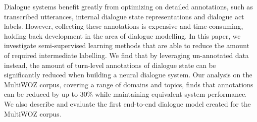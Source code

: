 Dialogue systems benefit greatly from optimizing on detailed annotations, such as transcribed utterances, internal dialogue state representations and dialogue act labels. However, collecting these annotations is expensive and time-consuming, holding back development in the area of dialogue modelling.
In this paper, we investigate semi-supervised learning methods that are able to reduce the amount of required intermediate labelling. We find that by leveraging un-annotated data instead, the amount of turn-level annotations of dialogue state can be significantly reduced when building a neural dialogue system. Our analysis on the MultiWOZ corpus, covering a range of domains and topics, finds that annotations can be reduced by up to 30\% while maintaining equivalent system performance. We also describe and evaluate the first end-to-end dialogue model created for the MultiWOZ corpus.